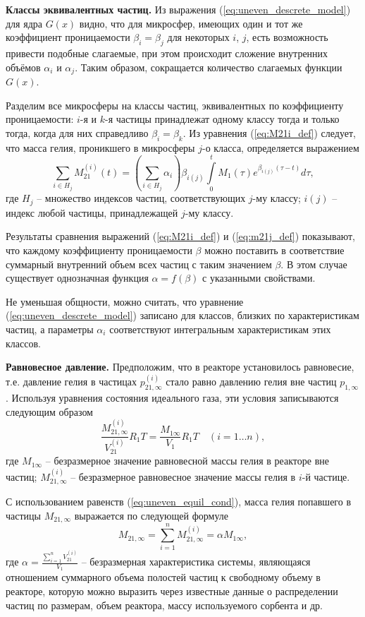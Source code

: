 \textbf{Классы эквивалентных частиц.} Из выражения (\ref{eq:uneven_descrete_model}) для ядра $G(x)$  видно, что для микросфер, имеющих один и тот же коэффициент проницаемости $\beta_i=\beta_j$ для некоторых $i$, $j$, есть возможность привести подобные слагаемые, при этом происходит сложение внутренних объёмов $\alpha_i$ и $\alpha_j$. Таким образом, сокращается количество слагаемых функции $G(x)$.


Разделим все микросферы на классы частиц, эквивалентных по коэффициенту проницаемости:  $i$-я и $k$-я частицы принадлежат одному классу тогда и только тогда, когда для них справедливо $\beta_i=\beta_k$. Из уравнения (\ref{eq:M21i_def}) следует, что масса гелия, проникшего в микросферы $j$-о класса, определяется выражением
\begin{equation}
\label{eq:m21j_def}
\sum\limits_{i \in H_j} M_{21}^{(i)}(t) = \left(\sum _{i \in H_j} \alpha_i \right) \beta_{i(j)} \int\limits_{0}^{t}M_1(\tau) e^{\beta_{i(j)} (\tau-t)} d\tau,
\end{equation}
где $H_j$ -- множество индексов частиц, соответствующих $j$-му классу; $i(j)$ -- индекс любой частицы, принадлежащей $j$-му классу.

Результаты сравнения выражений (\ref{eq:M21i_def}) и (\ref{eq:m21j_def}) показывают, что каждому коэффициенту проницаемости $\beta$ можно поставить в соответствие суммарный внутренний объем всех частиц с таким значением $\beta$. В этом случае существует однозначная функция $\alpha=f(\beta)$ с указанными свойствами.

Не уменьшая общности, можно считать, что уравнение (\ref{eq:uneven_descrete_model}) записано для классов,  близких по характеристикам частиц, а параметры $\alpha_i$ соответствуют интегральным характеристикам этих классов. 

\textbf{Равновесное давление.}
Предположим, что в реакторе установилось равновесие, т.е. давление гелия в частицах $p_{21,\infty}^{(i)}$ стало равно давлению гелия вне частиц $p_{1,\infty}$. Используя уравнения состояния идеального газа, эти условия записываются следующим образом
\begin{equation}
\label{eq:uneven_equil_cond}
\frac{M_{21,\infty}^{(i)}}{V_{21}^{(i)}} R_1 T = \frac{M_{1\infty}}{V_1}R_1 T \quad (i=1 \ldots n),
\end{equation}
где $M_{1\infty}$ -- безразмерное значение равновесной массы гелия в реакторе вне частиц; $M_{21,\infty}^{(i)}$ -- безразмерное равновесное значение массы гелия в $i$-й частице.

С использованием равенств (\ref{eq:uneven_equil_cond}), масса гелия попавшего в частицы $M_{21,\infty}$ выражается по следующей формуле
\begin{equation}
\label{eq:uneven_M21_infty}
M_{21,\infty} = \sum\limits_{i=1}^{n}M_{21,\infty}^{(i)}=\alpha M_{1\infty}, 
\end{equation}
где $\alpha = \displaystyle\frac{\sum\limits_{i=1}^{n} V_{21}^{(i)}}{V_1}$ -- безразмерная характеристика системы, являющаяся отношением суммарного объема полостей частиц к свободному объему в реакторе, которую можно выразить через известные данные о распределении частиц по размерам, объем реактора, массу используемого сорбента и др.

